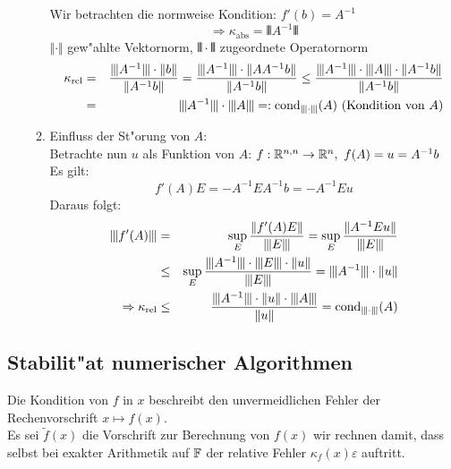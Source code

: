 \documentclass{scrartcl}
\begin{document}
\begin{itemize}
\begin{enumerate}
Wir betrachten die normweise Kondition: $f'(b) = A^{-1}$
$$\Rightarrow \kappa_\mathrm{abs} = \Vvert A^{-1} \Vvert$$
$\Vert \cdot \Vert$ gew"ahlte Vektornorm, $\Vvert \cdot \Vvert$ zugeordnete Operatornorm 
\begin{eqnarray*}
\kappa_\mathrm{rel} & = & \frac{ \vert \hspace{-0.7pt} \vert \hspace{-0.7pt} \vert A^{-1} \vert \hspace{-0.7pt} \vert \hspace{-0.7pt} \vert \cdot \Vert b \Vert}{ \Vert A^{-1} b \Vert} = \frac{ \vert \hspace{-0.7pt} \vert \hspace{-0.7pt} \vert A^{-1} \vert \hspace{-0.7pt} \vert \hspace{-0.7pt} \vert \cdot \Vert A A^{-1} b \Vert }{ \Vert A^{-1} b \Vert } \leq \frac{ \vert \hspace{-0.7pt} \vert \hspace{-0.7pt} \vert A^{-1} \vert \hspace{-0.7pt} \vert \hspace{-0.7pt} \vert \cdot \vert \hspace{-0.7pt} \vert \hspace{-0.7pt} \vert A \vert \hspace{-0.7pt} \vert \hspace{-0.7pt} \vert \cdot \Vert A^{-1} b \Vert }{\Vert A^{-1} b \Vert} \\
& = & \vert \hspace{-0.7pt} \vert \hspace{-0.7pt} \vert A^{-1} \vert \hspace{-0.7pt} \vert \hspace{-0.7pt} \vert \cdot \vert \hspace{-0.7pt} \vert \hspace{-0.7pt} \vert A \vert \hspace{-0.7pt} \vert \hspace{-0.7pt} \vert =: \mathrm{cond}_{\vert \hspace{-0.7pt} \vert \hspace{-0.7pt} \vert \cdot \vert \hspace{-0.7pt} \vert \hspace{-0.7pt} \vert} (A) \ \mathrm{(Kondition \ von \ } A)
\end{eqnarray*}
\item Einfluss der St"orung von $A$: \\ Betrachte nun $u$ als Funktion von $A$: $f: \mathbb{R}^{n,n} \rightarrow \mathbb{R}^n, \ f(A) = u = A^{-1} b$ \\
Es gilt:
$$f'(A) E = -A^{-1} E A^{-1} b = -A^{-1}Eu$$
Daraus folgt:
\begin{eqnarray*}
\Vvert f'(A) \Vvert & = & \sup\limits_E \frac{ \Vert f'(A) E \Vert }{\Vvert E \Vvert} = \sup\limits_E \frac{ \Vert A^{-1} E u \Vert }{ \Vvert E \Vvert } \\
& \leq & \sup\limits_E \frac{ \Vvert A^{-1} \Vvert \cdot \Vvert E \Vvert \cdot \Vert u \Vert }{\Vvert E \Vvert } = \Vvert A^{-1} \Vvert \cdot \Vert u \Vert \\
\Rightarrow \kappa_\mathrm{rel} & \leq & \frac{ \Vvert A^{-1} \Vvert \cdot \Vert u \Vert \cdot \Vvert A \Vvert }{ \Vert u \Vert } = \cond_{\Vvert \cdot \Vvert}(A)
\end{eqnarray*}
\end{enumerate}
\end{itemize}

\subsection{Stabilit"at numerischer Algorithmen}
Die Kondition von $f$ in $x$ beschreibt den unvermeidlichen Fehler der Rechenvorschrift $x \mapsto f(x)$. \\
Es sei $\tilde{f}(x)$ die Vorschrift zur Berechnung von $f(x)$ wir rechnen damit, dass selbst bei exakter Arithmetik auf $\mathbb{F}$ der relative Fehler $\kappa_f(x) \varepsilon$ auftritt.
\end{document}
